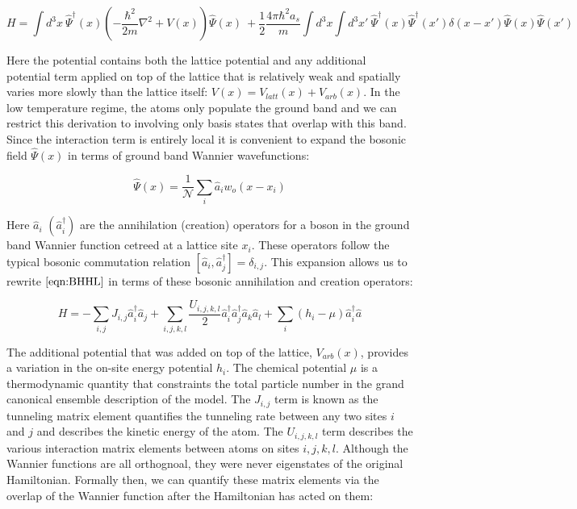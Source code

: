 \begin{equation}
\label{eqn:BHHL}
H =  \int d^3 x~\hat{\Psi}^\dagger (x) \left ( -\frac{\hbar^2}{2m} \nabla^2 + V(x) \right ) \hat{\Psi}(x) ~+ \frac{1}{2} \frac{4 \pi \hbar^2 a_s}{m} \int d^3 x \int d^3 x' ~\hat{\Psi}^\dagger (x) \hat{\Psi}^\dagger (x') \delta(x-x') \hat{\Psi} (x) \hat{\Psi} (x')
\end{equation}

Here the potential contains both the lattice potential and any additional potential term applied on top of the lattice that is relatively weak and spatially varies more slowly than the lattice itself: $V(x)=V_{latt}(x) + V_{arb}(x)$. In the low temperature regime, the atoms only populate the ground band and we can restrict this derivation to involving only basis states that overlap with this band. Since the interaction term is entirely local it is convenient to expand the bosonic field $\hat{\Psi}(x)$ in terms of ground band Wannier wavefunctions:

\begin{equation}
\label{eqn:wfh}
\hat{\Psi}(x) = \frac{1}{\mathcal{N}} \sum_i \hat{a}_i w_o(x-x_i)
\end{equation}

Here $\hat{a}_i$ $(\hat{a}^\dagger_i)$ are the annihilation (creation) operators for a boson in the ground band Wannier function cetreed at a lattice site $x_i$. These operators follow the typical bosonic commutation relation  $  [\hat{a}_i, \hat{a}_j^\dagger]=\delta_{i,j}$. This expansion allows us to rewrite $\ref{eqn:BHHL}$ in terms of these bosonic annihilation and creation operators:

\begin{equation}
\label{eqn:BHM}
H= - \sum_{i,j} J_{i,j} \hat{a}_i^\dagger \hat{a}_j + \sum_{i,j,k,l} \frac{U_{i,j,k,l}}{2} \hat{a}_i^\dagger \hat{a}_j^\dagger \hat{a}_k \hat{a}_l + \sum_i (h_i - \mu) \hat{a}^\dagger_i \hat{a}
\end{equation}

The additional potential that was added on top of the lattice, $V_{arb}(x)$, provides a variation in the on-site energy potential $h_i$. The chemical potential $\mu$ is a thermodynamic quantity that constraints the total particle number  in the grand canonical ensemble description of the model.  The $J_{i,j}$ term is known as the tunneling matrix element quantifies the tunneling rate between any two sites $i$ and $j$ and describes the kinetic energy of the atom. The $U_{i,j,k,l}$ term describes the various interaction matrix elements between atoms on sites $i,j,k,l$.  Although the Wannier functions are all orthognoal, they were never eigenstates of the original Hamiltonian. Formally then, we can quantify these matrix elements via the overlap of the Wannier function after the Hamiltonian has acted on them: 

